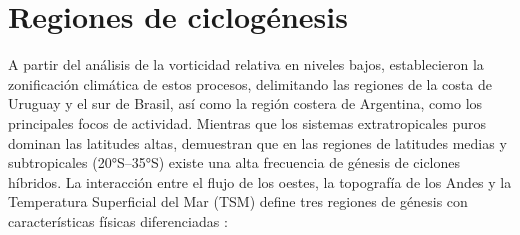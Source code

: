 \section{Regiones de ciclogénesis}\label{sec:tb_regiones}

A partir del análisis de la vorticidad relativa en niveles bajos, \citet{reboita2010south} establecieron la zonificación climática de estos procesos, delimitando las regiones de la costa de Uruguay y el sur de Brasil, así como la región costera de Argentina, como los principales focos de actividad. Mientras que los sistemas extratropicales puros dominan las latitudes altas, \citet{gozzo2014subtropical} demuestran que en las regiones de latitudes medias y subtropicales (20°S--35°S) existe una alta frecuencia de génesis de ciclones híbridos. La interacción entre el flujo de los oestes, la topografía de los Andes y la Temperatura Superficial del Mar (TSM) define tres regiones de génesis con características físicas diferenciadas \citep{gramcianinov2019properties}: 

%
